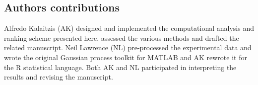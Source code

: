     \subsection{Authors contributions}
      Alfredo Kalaitzis (AK) designed and implemented the computational analysis and ranking scheme presented here, assessed the various methods  and drafted the related manuscript.
      Neil Lawrence (NL) pre-processed the experimental data and wrote the original Gaussian process toolkit for MATLAB and AK rewrote it for the R statistical language.
      Both AK and NL participated in interpreting the results and revising the manuscript.



